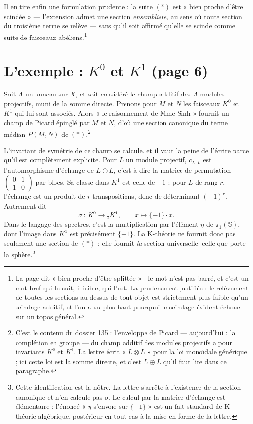 \documentclass[11pt,a4paper]{article}
\begin{document}
Il en tire enfin une formulation prudente : la suite $(*)$ est « bien
proche d'être scindée » --- l'extension admet une section \emph{ensembliste},
au sens où toute section du troisième terme se relève --- sans qu'il soit
affirmé qu'elle se scinde comme suite de faisceaux abéliens.\footnote{La page
dit « bien proche d'être splittée » ; le mot n'est pas barré, et c'est un mot
bref qui le suit, illisible, qui l'est. La prudence est justifiée : le
relèvement de toutes les sections au-dessus de tout objet est strictement plus
faible qu'un scindage additif, et l'on a vu plus haut pourquoi le scindage
évident échoue sur un topos général.}

\section*{L'exemple : $K^0$ et $K^1$ (page 6)}

Soit $A$ un anneau sur $X$, et soit considéré le champ additif des
$A$-modules projectifs, muni de la somme directe. Prenons pour $M$ et $N$ les
faisceaux $K^0$ et $K^1$ qui lui sont associés. Alors « le raisonnement de Mme Sinh »
fournit un champ de Picard épinglé par $M$ et $N$, d'où une section canonique
du terme médian $P(M,N)$ de $(*)$.\footnote{C'est le contenu du dossier 135 :
l'enveloppe de Picard --- aujourd'hui : la complétion en groupe --- du champ
additif des modules projectifs a pour invariants $K^0$ et $K^1$. La lettre
écrit « $L \otimes L$ » pour la loi monoïdale générique ; ici cette loi est la
somme directe, et c'est $L \oplus L$ qu'il faut lire dans ce paragraphe.}

L'invariant de symétrie de ce champ se calcule, et il vaut la peine de
l'écrire parce qu'il est complètement explicite. Pour $L$ un module projectif,
$c_{L,L}$ est l'automorphisme d'échange de $L \oplus L$, c'est-à-dire la
matrice de permutation $\left(\begin{smallmatrix} 0 & 1 \\ 1 &
0\end{smallmatrix}\right)$ par blocs. Sa classe dans $K^1$ est celle de
$-1$ : pour $L$ de rang $r$, l'échange est un produit de $r$ transpositions,
donc de déterminant $(-1)^r$. Autrement dit
\[ \sigma \,:\, K^0 \longrightarrow {}_2 K^1, \qquad
   x \longmapsto \{-1\} \cdot x . \]
Dans le langage des spectres, c'est la multiplication par l'élément $\eta$ de
$\pi_1(\mathbb{S})$, dont l'image dans $K^1$ est précisément $\{-1\}$. La
K-théorie ne fournit donc pas seulement une section de $(*)$ : elle fournit
\emph{la} section universelle, celle que porte la sphère.\footnote{Cette
identification est la nôtre. La lettre s'arrête à l'existence de la section
canonique et n'en calcule pas $\sigma$. Le calcul par la matrice d'échange
est élémentaire ; l'énoncé « $\eta$ s'envoie sur $\{-1\}$ » est un fait
standard de K-théorie algébrique, postérieur en tout cas à la mise en forme
de la lettre.}
\end{document}
